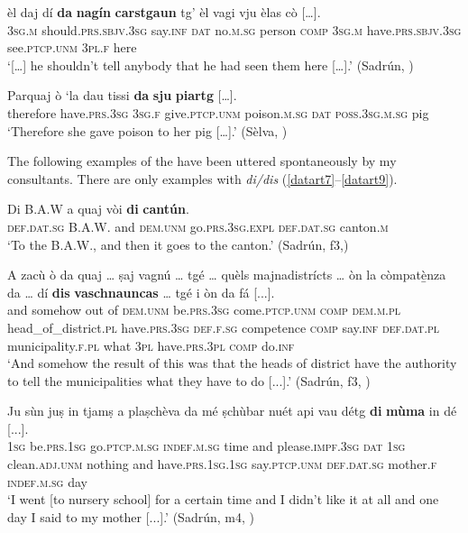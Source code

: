 \ea\label{ex:dat:indef:3}
\gll […] èl daj dí \textbf{da} \textbf{nagín} \textbf{carstgaun} tg’ èl vagi vju èlas cò […].\\
{} \textsc{3sg.m} should.\textsc{prs.sbjv.3sg} say.\textsc{inf} \textsc{dat} no.\textsc{m.sg} person \textsc{comp} \textsc{3sg.m} have.\textsc{prs.sbjv.3sg} see.\textsc{ptcp.unm} \textsc{3pl.f} here\\
\glt `[…] he shouldn’t tell anybody that he had seen them here […].' (Sadrún, \citealt[104]{Büchli1966})
\z

\ea\label{ex:dat:indef:4}
\gll Parquaj ò ‘la dau tissi \textbf{da} \textbf{sju} \textbf{piartg} […].\\
therefore have.\textsc{prs.3sg} \textsc{3sg.f} give.\textsc{ptcp.unm} poison.\textsc{m.sg} \textsc{dat} \textsc{poss.3sg.m.sg} pig \\
\glt `Therefore she gave poison to her pig […].' (Sèlva, \citealt[25]{Büchli1966})
\z

The following examples of the  have been uttered spontaneously by my consultants. There are only examples with \textit{di/dis} (\ref{datart7}--\ref{datart9}).

\ea\label{datart7}
\gll  Di B.A.W a quaj vòi \textbf{di} \textbf{cantún}.\\
\textsc{def.dat.sg} B.A.W. and \textsc{dem.unm} go.\textsc{prs.3sg.expl} \textsc{def.dat.sg} canton.\textsc{m}\\
\glt `To the B.A.W., and then it goes to the canton.' (Sadrún, f3,)
\z

\ea\label{datart8}
\gll A zacù ò da quaj … ṣaj vagnú … tgé … quèls majnadistrícts … òn la còmpat{\`e̱}nza da … dí \textbf{dis} \textbf{vaschnauncas} … tgé i òn da fá [...].\\
and somehow out of \textsc{dem.unm} {} be.\textsc{prs.3sg} come.\textsc{ptcp.unm} {} \textsc{comp} {} \textsc{dem.m.pl} head\_of\_district.\textsc{pl} {} have.\textsc{prs.3sg} \textsc{def.f.sg} competence \textsc{comp} {} say.\textsc{inf}  \textsc{def.dat.pl} municipality.\textsc{f.pl} {} what \textsc{3pl} have.\textsc{prs.3pl}  \textsc{comp} do.\textsc{inf} \\
\glt `And somehow the result of this was that the heads of district have the authority to tell the municipalities what they have to do [...].' (Sadrún, f3, )
\z

\ea
\label{datart9}
\gll  Ju sùn juṣ in tjamṣ a plaṣchèva da mé ṣchùbar nuét api vau détg \textbf{di} \textbf{mùma} in dé [...]. \\
 \textsc{1sg} be.\textsc{prs.1sg} go.\textsc{ptcp.m.sg} \textsc{indef.m.sg} time and please.\textsc{impf.3sg} \textsc{dat} \textsc{1sg} clean.\textsc{adj.unm} nothing and have.\textsc{prs.1sg.1sg} say.\textsc{ptcp.unm} \textsc{def.dat.sg} mother.\textsc{f} \textsc{indef.m.sg} day\\
\glt `I went [to nursery school] for a certain time and I didn’t like it at all and one day I said to my mother [...].' (Sadrún, m4, )
\z

